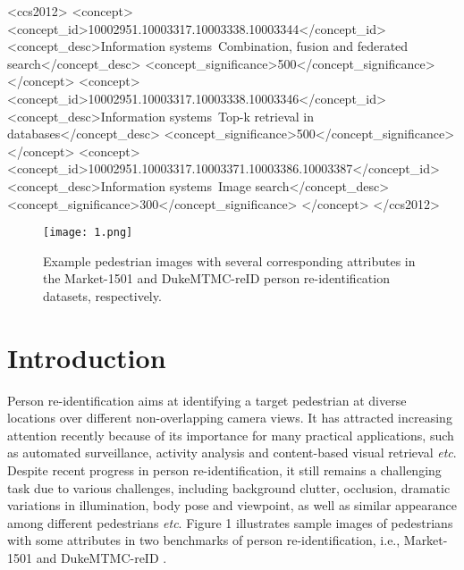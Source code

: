 \documentclass[sigconf]{acmart}
\begin{document}
%
%
\begin{CCSXML}
	<ccs2012>
	<concept>
	<concept_id>10002951.10003317.10003338.10003344</concept_id>
	<concept_desc>Information systems~Combination, fusion and federated search</concept_desc>
	<concept_significance>500</concept_significance>
	</concept>
	<concept>
	<concept_id>10002951.10003317.10003338.10003346</concept_id>
	<concept_desc>Information systems~Top-k retrieval in databases</concept_desc>
	<concept_significance>500</concept_significance>
	</concept>
	<concept>
	<concept_id>10002951.10003317.10003371.10003386.10003387</concept_id>
	<concept_desc>Information systems~Image search</concept_desc>
	<concept_significance>300</concept_significance>
	</concept>
	</ccs2012>
\end{CCSXML}





\maketitle

\begin{figure}[!t]
	\begin{center}
		\texttt{[image: 1.png]}
	\end{center}
	\caption{Example pedestrian images with several corresponding attributes in the Market-1501 and DukeMTMC-reID person re-identification datasets, respectively.}
	\label{fig:long}
	\label{fig:onecol}
\end{figure}\section{Introduction}
Person re-identification aims at identifying a target pedestrian at diverse locations over different non-overlapping camera views. It has attracted increasing attention recently because of its importance for many practical applications, such as automated surveillance, activity analysis and content-based visual retrieval \textit{etc}\cite{40,59}. Despite recent progress in person re-identification, it still remains a challenging task due to various challenges, including background clutter, occlusion, dramatic variations in illumination, body pose and viewpoint, as well as similar appearance among different pedestrians \textit{etc}. Figure 1 illustrates sample images of pedestrians with some attributes in two benchmarks of person re-identification, i.e., Market-1501 \cite{17} and DukeMTMC-reID \cite{18}.
\end{document}
